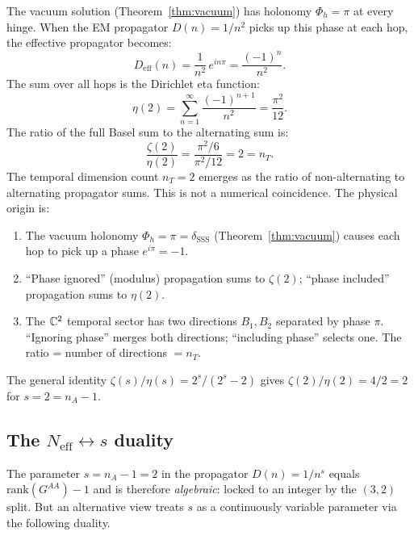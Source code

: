 \begin{remark}
\label{rem:zeta_eta}
The vacuum solution (Theorem~\ref{thm:vacuum}) has holonomy $\Phi_h = \pi$ at every hinge.  When the EM propagator $D(n) = 1/n^2$ picks up this phase at each hop, the effective propagator becomes:
\begin{equation}
D_\text{eff}(n) = \frac{1}{n^2}\,e^{in\pi} = \frac{(-1)^n}{n^2}.
\end{equation}
The sum over all hops is the Dirichlet eta function:
\begin{equation}
\eta(2) = \sum_{n=1}^{\infty}\frac{(-1)^{n+1}}{n^2} = \frac{\pi^2}{12}.
\end{equation}
The ratio of the full Basel sum to the alternating sum is:
\begin{equation}
\boxed{\frac{\zeta(2)}{\eta(2)} = \frac{\pi^2/6}{\pi^2/12} = 2 = n_T.}
\end{equation}
The temporal dimension count $n_T = 2$ emerges as the ratio of non-alternating to alternating propagator sums.  This is not a numerical coincidence.  The physical origin is:

\begin{enumerate}
\item The vacuum holonomy $\Phi_h = \pi = \delta_{\mathrm{SSS}}$ (Theorem~\ref{thm:vacuum}) causes each hop to pick up a phase $e^{i\pi} = -1$.
\item ``Phase ignored'' (modulus) propagation sums to $\zeta(2)$; ``phase included'' propagation sums to $\eta(2)$.
\item The $\mathbb{C}^2$ temporal sector has two directions $B_1, B_2$ separated by phase $\pi$.  ``Ignoring phase'' merges both directions; ``including phase'' selects one.  The ratio = number of directions $= n_T$.
\end{enumerate}

The general identity $\zeta(s)/\eta(s) = 2^s/(2^s - 2)$ gives $\zeta(2)/\eta(2) = 4/2 = 2$ for $s = 2 = n_A - 1$.
\end{remark}

\subsection{The $N_\text{eff} \leftrightarrow s$ duality}
\label{sec:Neff_s_duality}

The parameter $s = n_A - 1 = 2$ in the propagator $D(n) = 1/n^s$ equals $\mathrm{rank}(G^{AA}) - 1$ and is therefore \emph{algebraic}: locked to an integer by the $(3,2)$ split.  But an alternative view treats $s$ as a continuously variable parameter via the following duality.

